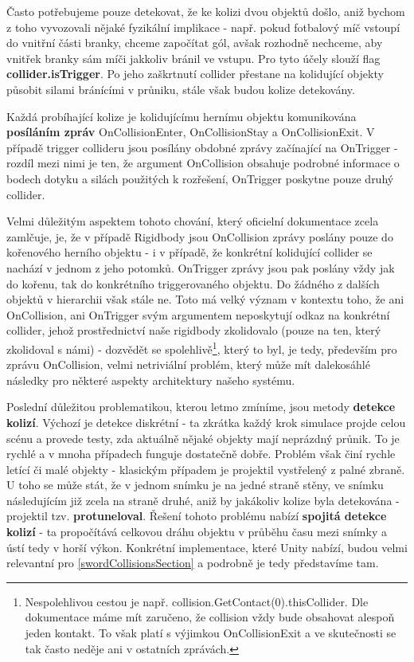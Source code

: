 Často potřebujeme pouze detekovat, že ke kolizi dvou objektů došlo, aniž bychom z toho vyvozovali nějaké fyzikální implikace - např. pokud fotbalový míč vstoupí do vnitřní části branky, chceme započítat gól, avšak rozhodně nechceme, aby vnitřek branky sám míči jakkoliv bránil ve vstupu. Pro tyto účely slouží flag \textbf{collider.isTrigger}. Po jeho zaškrtnutí collider přestane na kolidující objekty působit silami bránícími v průniku, stále však budou kolize detekovány.

Každá probíhající kolize je kolidujícímu hernímu objektu komunikována \textbf{posíláním zpráv} OnCollisionEnter, OnCollisionStay a OnCollisionExit. V případě trigger collideru jsou posílány obdobné zprávy začínající na OnTrigger - rozdíl mezi nimi je ten, že argument OnCollision obsahuje podrobné informace o bodech dotyku a silách použitých k rozřešení, OnTrigger poskytne pouze druhý collider. 

Velmi důležitým aspektem tohoto chování, který oficielní dokumentace zcela zamlčuje, je, že v případě Rigidbody jsou OnCollision zprávy poslány pouze do kořenového herního objektu - i v případě, že konkrétní kolidující collider se nachází v jednom z jeho potomků. OnTrigger zprávy jsou pak poslány vždy jak do kořenu, tak do konkrétního triggerovaného objektu. Do žádného z dalších objektů v hierarchii však stále ne. Toto má velký význam v kontextu toho, že ani OnCollision, ani OnTrigger svým argumentem neposkytují odkaz na konkrétní collider, jehož prostřednictví naše rigidbody zkolidovalo (pouze na ten, který zkolidoval s námi) - dozvědět se spolehlivě\footnote{Nespolehlivou cestou je např. collision.GetContact(0).thisCollider. Dle dokumentace máme mít zaručeno, že collision vždy bude obsahovat alespoň jeden kontakt. To však platí s výjimkou OnCollisionExit a ve skutečnosti se tak často neděje ani v ostatních zprávách.}, který to byl, je tedy, především pro zprávu OnCollision, velmi netriviální problém, který může mít dalekosáhlé následky pro některé aspekty architektury našeho systému.

Poslední důležitou problematikou, kterou letmo zmíníme, jsou metody \textbf{detekce kolizí}. Výchozí je detekce diskrétní - ta zkrátka každý krok simulace projde celou scénu a provede testy, zda aktuálně nějaké objekty mají neprázdný průnik. To je rychlé a v mnoha případech funguje dostatečně dobře. Problém však činí rychle letící či malé objekty - klasickým případem je projektil vystřelený z palné zbraně. U toho se může stát, že v jednom snímku je na jedné straně stěny, ve snímku následujícím již zcela na straně druhé, aniž by jakákoliv kolize byla detekována - projektil tzv. \textbf{protuneloval}. Řešení tohoto problému nabízí \textbf{spojitá detekce kolizí} - ta propočítává celkovou dráhu objektu v průběhu času mezi snímky a ústí tedy v horší výkon. Konkrétní implementace, které Unity nabízí, budou velmi relevantní pro \ref{swordCollisionsSection} a podrobně je tedy představíme tam.

